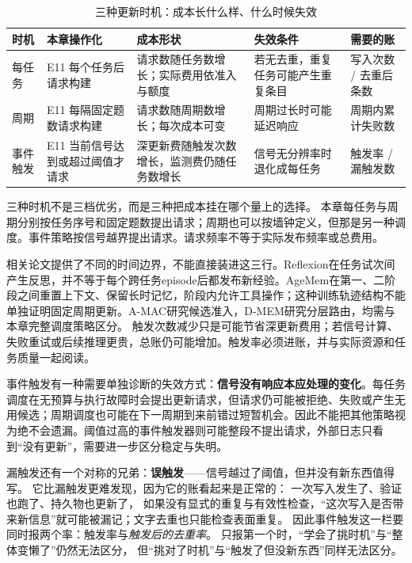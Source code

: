 \begin{table}[htbp]
\centering
\caption{三种更新时机：成本长什么样、什么时候失效}
\label{tab:ch13-timing}
\small\setlength{\tabcolsep}{3pt}
\begin{tabular}{>{\raggedright\arraybackslash}p{1.7cm}>{\raggedright\arraybackslash}p{3.0cm}>{\raggedright\arraybackslash}p{3.1cm}>{\raggedright\arraybackslash}p{3.1cm}>{\raggedright\arraybackslash}p{3.2cm}}
\toprule
时机 & 本章操作化 & 成本形状 & 失效条件 & 需要的账 \\
\midrule
每任务 & E11 每个任务后请求构建 & 请求数随任务数增长；实际费用依准入与额度 & 若无去重，重复任务可能产生重复条目 & 写入次数 / 去重后条数 \\
周期 & E11 每隔固定题数请求构建 & 请求数随周期数增长；每次成本可变 & 周期过长时可能延迟响应 & 周期内累计失败数 \\
事件触发 & E11 当前信号达到或超过阈值才请求 & 深更新费随触发次数增长，监测费仍随任务数增长 & 信号无分辨率时退化成每任务 & 触发率 / 漏触发数 \\
\bottomrule
\end{tabular}
\end{table}

三种时机不是三档优劣，而是三种把成本挂在哪个量上的选择。
本章每任务与周期分别按任务序号和固定题数提出请求；周期也可以按墙钟定义，但那是另一种调度。事件策略按信号越界提出请求。请求频率不等于实际发布频率或总费用。

相关论文提供了不同的时间边界，不能直接装进这三行。Reflexion在任务试次间产生反思，并不等于每个跨任务episode后都发布新经验\cite{reflexion-2303}。AgeMem在第一、二阶段之间重置上下文、保留长时记忆，阶段内允许工具操作；这种训练轨迹结构不能单独证明固定周期更新\cite{agemem-2601}。A-MAC研究候选准入，D-MEM研究分层路由，均需与本章完整调度策略区分。
触发次数减少只是可能节省深更新费用；若信号计算、失败重试或后续推理更贵，总账仍可能增加。触发率必须进账，并与实际资源和任务质量一起阅读。

事件触发有一种需要单独诊断的失效方式：\textbf{信号没有响应本应处理的变化}。每任务调度在无预算与执行故障时会提出更新请求，但请求仍可能被拒绝、失败或产生无用候选；周期调度也可能在下一周期到来前错过短暂机会。因此不能把其他策略视为绝不会遗漏。阈值过高的事件触发器则可能整段不提出请求，外部日志只看到“没有更新”，需要进一步区分稳定与失明。

\begin{sloppypar}
漏触发还有一个对称的兄弟：\textbf{误触发}——信号越过了阈值，但并没有新东西值得写。
它比漏触发更难发现，因为它的账看起来是正常的：
一次写入发生了、验证也跑了、持久物也更新了，
如果没有显式的重复与有效性检查，“这次写入是否带来新信息”就可能被漏记；文字去重也只能检查表面重复。
因此事件触发这一栏要同时报两个率：触发率与\emph{触发后的去重率}。
只报第一个时，“学会了挑时机”与“整体变懒了”仍然无法区分，
但“挑对了时机”与“触发了但没新东西”同样无法区分。
\end{sloppypar}

